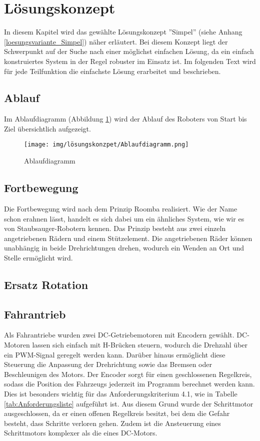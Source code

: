 \documentclass[../main.tex]{subfiles}
\begin{document}
\newpage
\section{Lösungskonzept}

In diesem Kapitel wird das gewählte Lösungskonzept ''Simpel'' (siehe Anhang \ref{loesungsvariante_Simpel}) näher erläutert. Bei diesem Konzept liegt der Schwerpunkt auf der Suche nach einer möglichst einfachen Lösung, da ein einfach konstruiertes System in der Regel robuster im Einsatz ist. Im folgenden Text wird für jede Teilfunktion die einfachste Lösung erarbeitet und beschrieben.

\subsection{Ablauf}

Im Ablaufdiagramm (Abbildung \ref{img:ablaufdiagramm}) wird der Ablauf des Roboters von Start bis Ziel übersichtlich aufgezeigt.

\begin{figure}[H]
\texttt{[image: img/lösungskonzpet/Ablaufdiagramm.png]}
\caption{Ablaufdiagramm}
\label{img:ablaufdiagramm}
\end{figure}

\subsection{Fortbewegung}

Die Fortbewegung wird nach dem Prinzip Roomba realisiert. Wie der Name schon erahnen lässt, handelt es sich dabei um ein ähnliches System, wie wir es von Staubsauger-Robotern kennen. Das Prinzip besteht aus zwei einzeln angetriebenen Rädern und einem Stützelement. Die angetriebenen Räder können unabhängig in beide Drehrichtungen drehen, wodurch ein Wenden an Ort und Stelle ermöglicht wird.

\subsection{Ersatz Rotation}    %



\subsection{Fahrantrieb}
Als Fahrantriebe wurden zwei DC-Getriebemotoren mit Encodern gewählt. DC-Motoren lassen sich einfach mit H-Brücken steuern, wodurch die Drehzahl über ein PWM-Signal geregelt werden kann. Darüber hinaus ermöglicht diese Steuerung die Anpassung der Drehrichtung sowie das Bremsen oder Beschleunigen des Motors. Der Encoder sorgt für einen geschlossenen Regelkreis, sodass die Position des Fahrzeugs jederzeit im Programm berechnet werden kann. Dies ist besonders wichtig für das Anforderungskriterium 4.1, wie in Tabelle \ref{tab:Anforderungsliste} aufgeführt ist. Aus diesem Grund wurde der Schrittmotor ausgeschlossen, da er einen offenen Regelkreis besitzt, bei dem die Gefahr besteht, dass Schritte verloren gehen. Zudem ist die Ansteuerung eines Schrittmotors komplexer als die eines DC-Motors.
\end{document}
